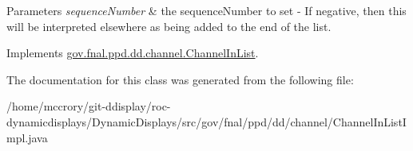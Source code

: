 \begin{DoxyParams}{Parameters}
{\em sequence\-Number} & the sequence\-Number to set -\/ If negative, then this will be interpreted elsewhere as being added to the end of the list. \\
\hline
\end{DoxyParams}


Implements \hyperlink{interfacegov_1_1fnal_1_1ppd_1_1dd_1_1channel_1_1ChannelInList_a248382f22bfd71369082af07784e0fff}{gov.\-fnal.\-ppd.\-dd.\-channel.\-Channel\-In\-List}.



The documentation for this class was generated from the following file\-:\begin{DoxyCompactItemize}
\item 
/home/mccrory/git-\/ddisplay/roc-\/dynamicdisplays/\-Dynamic\-Displays/src/gov/fnal/ppd/dd/channel/Channel\-In\-List\-Impl.\-java\end{DoxyCompactItemize}

